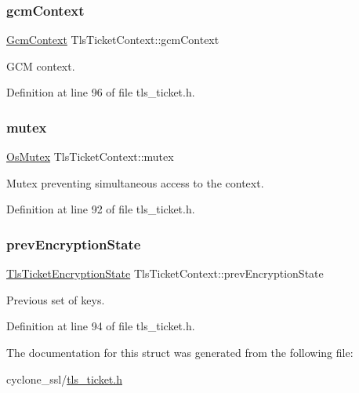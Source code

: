 \subsubsection{\texorpdfstring{gcm\+Context}{gcmContext}}
{\footnotesize\ttfamily \hyperlink{structGcmContext}{Gcm\+Context} Tls\+Ticket\+Context\+::gcm\+Context}



G\+CM context. 



Definition at line 96 of file tls\+\_\+ticket.\+h.

\mbox{\label{structTlsTicketContext_a849eb29051bd12f969adf692adcf77a1}} 
\subsubsection{\texorpdfstring{mutex}{mutex}}
{\footnotesize\ttfamily \hyperlink{structOsMutex}{Os\+Mutex} Tls\+Ticket\+Context\+::mutex}



Mutex preventing simultaneous access to the context. 



Definition at line 92 of file tls\+\_\+ticket.\+h.

\mbox{\label{structTlsTicketContext_a198a1a46a74ce01b4a1fd44671c053c1}} 
\subsubsection{\texorpdfstring{prev\+Encryption\+State}{prevEncryptionState}}
{\footnotesize\ttfamily \hyperlink{structTlsTicketEncryptionState}{Tls\+Ticket\+Encryption\+State} Tls\+Ticket\+Context\+::prev\+Encryption\+State}



Previous set of keys. 



Definition at line 94 of file tls\+\_\+ticket.\+h.



The documentation for this struct was generated from the following file\+:\begin{DoxyCompactItemize}
\item 
cyclone\+\_\+ssl/\hyperlink{tls__ticket_8h}{tls\+\_\+ticket.\+h}\end{DoxyCompactItemize}

